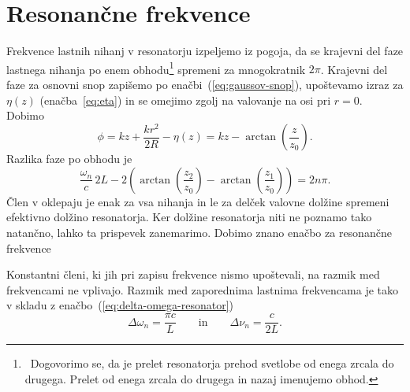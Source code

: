 \section{Resonančne frekvence}
Frekvence
lastnih nihanj v resonatorju izpeljemo iz pogoja, 
da se krajevni del faze lastnega nihanja po enem 
obhodu\footnote{~Dogovorimo se, da je prelet resonatorja prehod svetlobe od enega zrcala
do drugega. Prelet od enega zrcala do drugega in nazaj imenujemo obhod.}
spremeni za mnogokratnik $2\pi$. Krajevni del faze za osnovni snop 
zapišemo po enačbi~(\ref{eq:gaussov-snop}), upoštevamo izraz za
$\eta(z)$ (enačba~\ref{eq:eta}) in se omejimo zgolj na valovanje na osi pri $r=0$.
Dobimo
\begin{equation}
\phi = kz+\frac{kr^{2}}{2R} -\eta(z) = kz-\arctan \left(\frac{z}{z_{0}}\right)\!.
\label{eq:fazag}
\end{equation}
Razlika faze po obhodu je 
\begin{equation}
\frac{\omega_{n}}{c}\,2L-2\left(\arctan \left(\frac{z_{2}}{z_{0}}\right)-
\arctan\left(\frac{z_{1}}{z_{0}}\right)\right)=2n\pi.
\label{eq:fazan}
\end{equation}
Člen v oklepaju je enak za vsa nihanja in le za delček valovne dolžine 
spremeni efektivno dolžino resonatorja. Ker dolžine resonatorja niti ne poznamo
tako natančno, lahko ta prispevek zanemarimo. Dobimo znano enačbo za resonančne frekvence 

Konstantni členi, ki jih pri zapisu frekvence nismo upoštevali, na razmik med
frekvencami ne vplivajo. Razmik med zaporednima
lastnima frekvencama je tako v skladu z enačbo~(\ref{eq:delta-omega-resonator})
\begin{equation}
\Delta\omega_n=\frac{\pi c}{L} \qquad \mathrm{in}\qquad \Delta \nu_n=\frac{c}{2L}.
\label{eq:deltaomega}
\end{equation}


